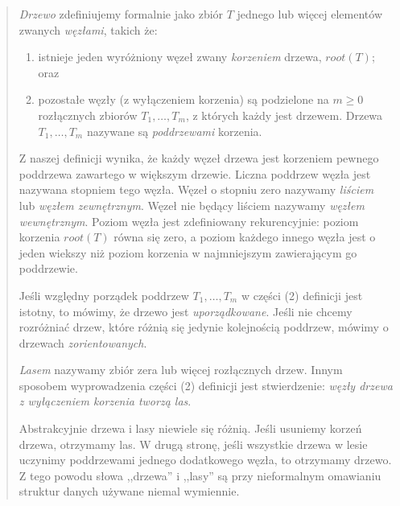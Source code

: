 \begin{quote}

\emph{Drzewo} zdefiniujemy formalnie jako zbiór $T$ jednego lub więcej elementów zwanych \emph{węzłami}, takich że:

\begin{enumerate}
 \item istnieje jeden wyróżniony węzeł zwany \emph{korzeniem} drzewa, $root(T)$; oraz
 \item pozostałe węzły (z wyłączeniem korzenia) są podzielone na $m \geq 0$ rozłącznych zbiorów $T_{1},\ldots, T_{m}$,
	z których każdy jest drzewem. Drzewa $T_{1},\ldots, T_{m}$ nazywane są \emph{poddrzewami} korzenia.
\end{enumerate}

Z naszej definicji wynika, że każdy węzeł drzewa jest korzeniem pewnego poddrzewa zawartego w większym drzewie.
Liczna poddrzew węzła jest nazywana stopniem tego węzła.
Węzeł o stopniu zero nazywamy \emph{liściem} lub \emph{węzłem zewnętrznym}. 
Węzeł nie będący liściem nazywamy \emph{węzłem wewnętrznym}. 
Poziom węzła jest zdefiniowany rekurencyjnie: poziom korzenia $root(T)$ równa się zero,
a poziom każdego innego węzła jest o jeden wiekszy niż poziom korzenia w najmniejszym 
 zawierającym go poddrzewie.




Jeśli względny porządek poddrzew $T_{1},\ldots, T_{m}$ w części (2) definicji jest istotny,
to mówimy, że drzewo jest \emph{uporządkowane}. 
Jeśli nie chcemy rozróżniać drzew, które różnią się jedynie kolejnością poddrzew, mówimy o drzewach \emph{zorientowanych}.

\emph{Lasem} nazywamy zbiór zera lub więcej rozłącznych drzew. 
Innym sposobem wyprowadzenia części (2) definicji jest stwierdzenie: \textit{węzły drzewa z wyłączeniem korzenia tworzą las}.

Abstrakcyjnie drzewa i lasy niewiele się różnią.
Jeśli usuniemy korzeń drzewa, otrzymamy las.
W drugą stronę, jeśli wszystkie drzewa w lesie uczynimy poddrzewami jednego dodatkowego węzła,
to otrzymamy drzewo.
Z tego powodu słowa ,,drzewa'' i ,,lasy'' są przy nieformalnym omawianiu struktur danych używane niemal wymiennie.

\end{quote}

